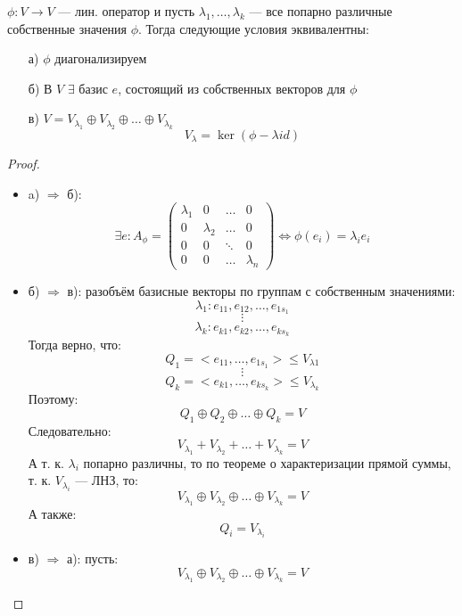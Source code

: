 \begin{theorem}
\label{theorem:04_1}
  $\phi \colon V \rightarrow V$ --- лин. оператор и пусть $\lambda_1, \ldots, \lambda_k$ --- все попарно различные собственные значения $\phi$. Тогда следующие условия эквивалентны:
  \begin{itemize}
    \item [а) ] $\phi$ диагонализируем
    \item [б) ] В $V$ $\exists$ базис $e$, состоящий из собственных векторов для $\phi$
    \item [в) ] $V = V_{\lambda_1} \oplus V_{\lambda_2} \oplus \ldots \oplus V_{\lambda_k}$
      \[
      V_{\lambda} = \ker(\phi - \lambda id)
      \]
  \end{itemize}
\end{theorem}
\begin{proof}
  \begin{itemize}
    \item a) $\Rightarrow $ б):
      \[
      \exists e \colon  A_\phi = \begin{pmatrix} \lambda_1 & 0 & \ldots & 0 \\ 0 & \lambda_2 & \ldots & 0 \\ 0 & 0 & \ddots &  0 \\ 0 & 0 & \ldots & \lambda_n\end{pmatrix} \iff \phi(e_i) = \lambda_i e_i
      \]
    \item б) $\Rightarrow$ в): разобъём базисные векторы по группам с собственным значениями:
      \[
      \lambda_1 \colon e_{11}, e_{12}, \ldots, e_{1 s_1}
      \]
      \[
      \vdots
      \]
      \[
      \lambda_k \colon e_{k 1}, e_{k 2}, \ldots, e_{k s_k}
      \]
      Тогда верно, что:
      \[
      Q_1 = <e_{11}, \ldots, e_{1 s_1}> \leq V_{\lambda 1}
      \]
      \[
      \vdots
      \]
      \[
      Q_k = <e_{k 1}, \ldots, e_{k s_k}> \leq V_{\lambda_k} 
      \]
      Поэтому:
      \[
      Q_1 \oplus Q_2 \oplus \ldots \oplus Q_k = V
      \]
      Следовательно:
      \[
      V_{\lambda_1} + V_{\lambda_2} + \ldots + V_{\lambda_k} = V
      \]
      А т. к. $\lambda_i$ попарно различны, то по теореме о характеризации прямой суммы, т. к. $V_{\lambda_i}$ --- ЛНЗ, то:
      \[
      V_{\lambda_1} \oplus V_{\lambda_2} \oplus \ldots \oplus V_{\lambda_k} = V
      \]
      А также:
      \[
      Q_i = V_{\lambda_i}
      \]
    \item в) $\Rightarrow$ а): пусть:
      \[
      V_{\lambda_1} \oplus V_{\lambda_2} \oplus \ldots \oplus V_{\lambda_k} = V
\]
\end{itemize}
\end{proof}
